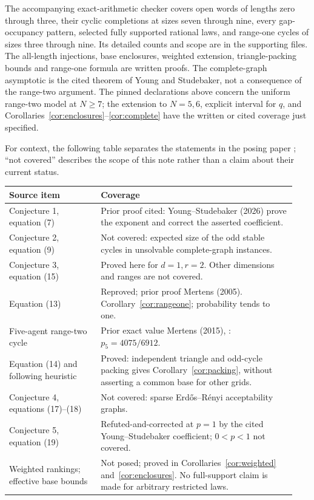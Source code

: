 \documentclass[11pt]{article}
\begin{document}
The accompanying exact-arithmetic checker covers open words of lengths
zero through three, their cyclic completions at sizes seven through nine,
every gap-occupancy pattern, selected fully supported rational laws, and
range-one cycles of sizes three through nine. Its detailed counts and
scope are in the supporting files. The all-length injections, base
enclosures, weighted extension, triangle-packing bounds and range-one
formula are written proofs. The complete-graph asymptotic is the cited
theorem of Young and Studebaker, not a consequence of the range-two
argument. The pinned declarations above concern the uniform range-two
model at $N\geq7$; the extension to $N=5,6$, explicit interval for $q$,
and Corollaries~\ref{cor:enclosures}--\ref{cor:complete} have the written
or cited coverage just specified.

For context, the following table separates the statements in the posing
paper \cite{mertens2005}; ``not covered'' describes the scope of this
note rather than a claim about their current status.
\begin{center}\small
\begin{tabular}{@{}p{0.30\linewidth}p{0.64\linewidth}@{}}
\toprule
Source item & Coverage \\
\midrule
Conjecture 1, equation (7) & Prior proof cited: Young--Studebaker (2026)
prove the exponent and correct the asserted coefficient.\\[3pt]
Conjecture 2, equation (9) & Not covered: expected size of the odd stable
cycles in unsolvable complete-graph instances.\\[3pt]
Conjecture 3, equation (15) & Proved here for $d=1,r=2$.
Other dimensions and ranges are not covered.\\[3pt]
Equation (13) & Reproved; prior proof Mertens (2005).
Corollary~\ref{cor:rangeone}; probability tends to one.\\[3pt]
Five-agent range-two cycle & Prior exact value Mertens (2015),
\cite[equation~(21b)]{mertenssmall2015}: $p_5=4075/6912$.\\[3pt]
Equation (14) and following heuristic & Proved: independent triangle
and odd-cycle packing gives Corollary~\ref{cor:packing}, without asserting a common
base for other grids.\\[3pt]
Conjecture 4, equations (17)--(18) & Not covered: sparse
Erd\H{o}s--R\'enyi acceptability graphs.\\[3pt]
Conjecture 5, equation (19) & Refuted-and-corrected at $p=1$ by the
cited Young--Studebaker coefficient; $0<p<1$ not covered.\\[3pt]
Weighted rankings; effective base bounds & Not posed; proved in
Corollaries~\ref{cor:weighted} and~\ref{cor:enclosures}.
No full-support claim is made for arbitrary restricted laws.\\
\bottomrule
\end{tabular}
\end{center}
\end{document}
